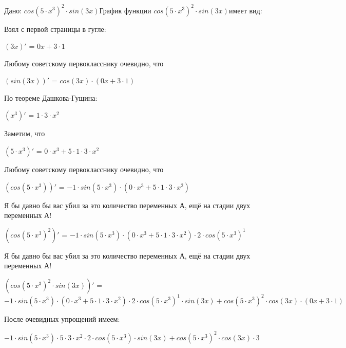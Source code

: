 \documentclass{article}
\begin{document}
Дано: ${cos(5 \cdot {x}^{3})}^{2} \cdot sin(3x)$\bigskip График функции ${cos(5 \cdot {x}^{3})}^{2} \cdot sin(3x)$имеет вид:

\begin{figure}[h]\label{fig:t}\end{figure}\bigskip Взял с первой страницы в гугле:

$(3x)'$ = $0x + 3 \cdot 1$

\bigskip Любому советскому первокласснику очевидно, что

$(sin(3x))'$ = $cos(3x) \cdot (0x + 3 \cdot 1)$

\bigskip По теореме Дашкова-Гущина:

$({x}^{3})'$ = $1 \cdot 3 \cdot {x}^{2}$

\bigskip Заметим, что

$(5 \cdot {x}^{3})'$ = $0 \cdot {x}^{3} + 5 \cdot 1 \cdot 3 \cdot {x}^{2}$

\bigskip Любому советскому первокласснику очевидно, что

$(cos(5 \cdot {x}^{3}))'$ = $-1 \cdot sin(5 \cdot {x}^{3}) \cdot (0 \cdot {x}^{3} + 5 \cdot 1 \cdot 3 \cdot {x}^{2})$

\bigskip Я бы давно бы вас убил за это количество переменных А, ещё на стадии двух переменных А!

$({cos(5 \cdot {x}^{3})}^{2})'$ = $-1 \cdot sin(5 \cdot {x}^{3}) \cdot (0 \cdot {x}^{3} + 5 \cdot 1 \cdot 3 \cdot {x}^{2}) \cdot 2 \cdot {cos(5 \cdot {x}^{3})}^{1}$

\bigskip Я бы давно бы вас убил за это количество переменных А, ещё на стадии двух переменных А!

$({cos(5 \cdot {x}^{3})}^{2} \cdot sin(3x))'$ = $-1 \cdot sin(5 \cdot {x}^{3}) \cdot (0 \cdot {x}^{3} + 5 \cdot 1 \cdot 3 \cdot {x}^{2}) \cdot 2 \cdot {cos(5 \cdot {x}^{3})}^{1} \cdot sin(3x) + {cos(5 \cdot {x}^{3})}^{2} \cdot cos(3x) \cdot (0x + 3 \cdot 1)$

\bigskip После очевидных упрощений имеем:

$-1 \cdot sin(5 \cdot {x}^{3}) \cdot 5 \cdot 3 \cdot {x}^{2} \cdot 2 \cdot cos(5 \cdot {x}^{3}) \cdot sin(3x) + {cos(5 \cdot {x}^{3})}^{2} \cdot cos(3x) \cdot 3$
\end{document}

